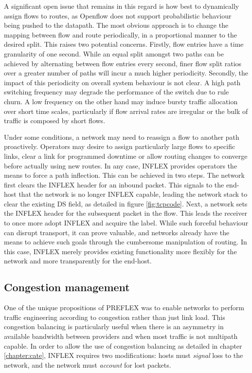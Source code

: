 A significant open issue that remains in this regard is how best to dynamically assign flows to routes, as Openflow does not support probabilistic behaviour being pushed to the datapath.
The most obvious approach is to change the mapping between flow and route periodically, in a proportional manner to the desired split.
This raises two potential concerns.
Firstly, flow entries have a time granularity of one second.
While an equal split amongst two paths can be achieved by alternating between flow entries every second, finer flow split ratios over a greater number of paths will incur a much higher periodicity.
Secondly, the impact of this periodicity on overall system behaviour is not clear.
A high path switching frequency may degrade the performance of the switch due to rule churn.
A low frequency on the other hand may induce bursty traffic allocation over short time scales, particularly if flow arrival rates are irregular or the bulk of traffic is composed by short flows.

Under some conditions, a network may need to reassign a flow to another path proactively.
Operators may desire to assign particularly large flows to specific links, clear a link for programmed downtime or allow routing changes to converge before actually using new routes.
In any case, INFLEX provides operators the means to force a path inflection.
This can be achieved in two steps.
The network first clears the INFLEX header for an inbound packet. 
This signals to the end-host that the network is no longer INFLEX capable, leading the network stack to clear the existing \ac{DS} field, as detailed in figure \ref{fig:tcpcode}.
Next, a network sets the INFLEX header for the subsequent packet in the flow.
This leads the receiver to once more adopt INFLEX and acquire the label.
While such forceful behaviour can disrupt transport, it can prove valuable, and networks already have the means to achieve such goals through the cumbersome manipulation of routing.
In this case, INFLEX merely provides existing functionality more flexibly for the network and more transparently for the end-host.

\subsection{Congestion management}

One of the unique propositions of \ac{PREFLEX} was to enable networks to perform traffic engineering according to congestion rather than just link load.
This congestion balancing is particularly useful when there is an asymmetry in available bandwidth between providers and when most traffic is not multipath capable.
In order to allow the use of congestion balancing as detailed in chapter \ref{chapter:cate}, INFLEX requires two modifications: hosts must \emph{signal} loss to the network, and the network must \emph{account} for lost packets.

